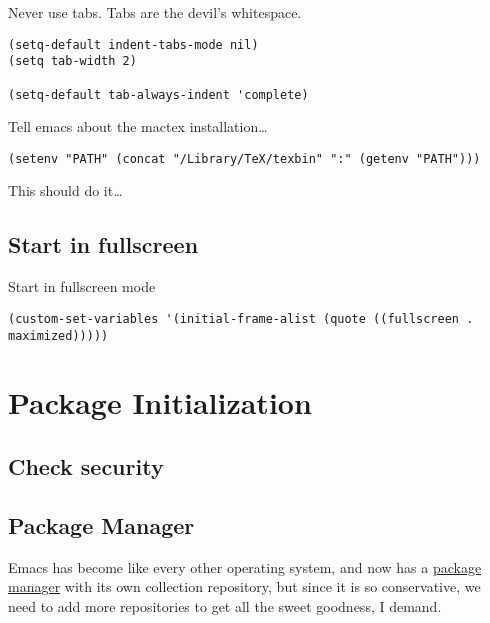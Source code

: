 \documentclass[12pt]{article}
\begin{document}
Never use tabs. Tabs are the devil’s whitespace.

\lstset{language=Lisp,label= ,caption= ,captionpos=b,numbers=none}
\begin{lstlisting}
(setq-default indent-tabs-mode nil)
(setq tab-width 2)

(setq-default tab-always-indent 'complete)
\end{lstlisting}

Tell emacs about the mactex installation\ldots{}

\lstset{language=Lisp,label= ,caption= ,captionpos=b,numbers=none}
\begin{lstlisting}
(setenv "PATH" (concat "/Library/TeX/texbin" ":" (getenv "PATH")))
\end{lstlisting}

This should do it\ldots{}




\subsection{Start in fullscreen}
\label{sec:orge46758f}

Start in fullscreen mode

\lstset{language=Lisp,label= ,caption= ,captionpos=b,numbers=none}
\begin{lstlisting}
(custom-set-variables '(initial-frame-alist (quote ((fullscreen . maximized)))))
\end{lstlisting}

\section{Package Initialization}
\label{sec:org1e2832e}

\subsection{Check security}
\label{sec:org449dee2}



\subsection{Package Manager}
\label{sec:orgd844162}

Emacs has become like every other operating system, and now has a
\href{http://tromey.com/elpa/}{package manager} with its own collection repository, but since it is
so conservative, we need to add more repositories to get all the
sweet goodness, I demand.
\end{document}
